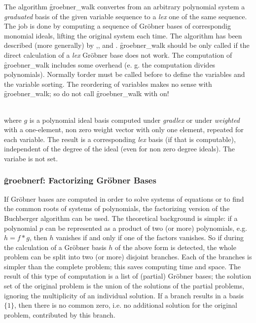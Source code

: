 \hypertarget{operator:GROEBNER_WALK}{}
The algorithm \f{groebner\_walk} convertes from an arbitrary polynomial
system a \emph{graduated} basis of the given variable sequence to a \emph{lex} one
of the same sequence. The job is done by computing a sequence
of Gr\"obner bases of correspondig monomial ideals, lifting the original
system each time. The algorithm has been described (more generally) by
\cite{AmrheinGloorKuechlin:96a},\cite{AmrheinGloorKuechlin:96b},\cite{AmrheinGloor:98} and \cite{Collart:97}.
\f{groebner\_walk} should be only called if the direct calculation of a
\emph{lex} Gr\"obner base does not work. The computation of \f{groebner\_walk}
includes some overhead (e. g. the computation divides polynomials).
Normally \f{torder} must be called before to define the variables and the variable
sorting. The reordering of variables makes no sense with \f{groebner\_walk};
so do not call \f{groebner\_walk} with  on!

\begin{description}
\item[\f{groebner\_walk} $g$]\mbox{}\\
where $g$ is a polynomial ideal basis computed under \emph{gradlex} or under
\emph{weighted} with a one-element, non zero weight vector with only one
element, repeated for each variable. The result is a corresponding
\emph{lex} basis (if that is computable), independent of the degree of the
ideal (even for non zero degree ideals).
The variabe  is not set.
\end{description}

\subsubsection{\f{groebnerf}: Factorizing Gr\"obner Bases}

\hypertarget{operator:GROEBNERF}{}
If Gr\"obner bases are computed in order to solve systems of
equations or to find the common roots of systems of polynomials,
the factorizing version of the Buchberger algorithm can be used.
The theoretical background is simple: if a polynomial $p$ can be
represented as a product of two (or more) polynomials, e.g. $h= f*g$,
then $h$ vanishes if and only if one of the factors vanishes. So if
during the calculation of a Gr\"obner basis $h$ of the above form is
detected, the whole problem can be split into two (or more)
disjoint branches. Each of the branches is simpler than the complete
problem; this saves computing time and space. The result of this
type of computation is a list of (partial) Gr\"obner bases; the
solution set of the original problem is the union of the solutions of
the partial problems, ignoring the multiplicity of an individual
solution. If a branch results in a basis $\{1\}$, then there is no
common zero, i.e. no additional solution for the original problem,
contributed by this branch.

